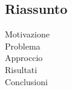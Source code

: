 \begin{otherlanguage}{italian}
\chapter*{Riassunto}

\begin{description}
  \item[Motivazione] 

  \item[Problema] 

  \item[Approccio] 

  \item[Risultati] 

  \item[Conclusioni]
\end{description}
\end{otherlanguage}